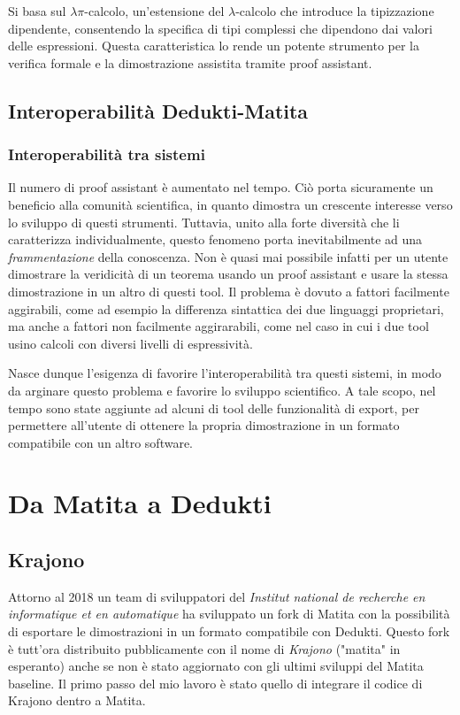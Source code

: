 \documentclass[12pt,a4paper]{report}
\begin{document}
Si basa sul $\lambda\pi$-calcolo, un'estensione del 
$\lambda$-calcolo che introduce la tipizzazione dipendente, consentendo la
specifica di tipi complessi che dipendono dai valori delle espressioni. Questa
caratteristica lo rende un potente strumento per la verifica formale e la
dimostrazione assistita tramite proof assistant.

\section{Interoperabilità Dedukti-Matita}

\subsection{Interoperabilità tra sistemi}
Il numero di proof assistant è aumentato nel tempo. Ciò porta sicuramente un
beneficio alla comunità scientifica, in quanto dimostra un crescente interesse
verso lo sviluppo di questi strumenti. Tuttavia, unito alla forte diversità che
li caratterizza individualmente, questo fenomeno porta inevitabilmente
ad una \textit{frammentazione} della conoscenza. Non è quasi mai possibile infatti
per un utente dimostrare la veridicità di un teorema usando un proof assistant
e usare la stessa dimostrazione in un altro di questi tool. Il problema è dovuto
a fattori facilmente aggirabili, come ad esempio la differenza sintattica dei due
linguaggi proprietari, ma anche a fattori non facilmente aggirarabili, come nel
caso in cui i due tool usino calcoli con diversi livelli di espressività.

Nasce dunque l'esigenza di favorire l'interoperabilità tra questi sistemi, in
modo da arginare questo problema e favorire lo sviluppo scientifico. 
A tale scopo, nel tempo sono state aggiunte ad alcuni di tool delle funzionalità
di export, per permettere all'utente di ottenere la propria dimostrazione in un
formato compatibile con un altro software.

\chapter{Da Matita a Dedukti} \label{capitoloExport}
\section{Krajono}
Attorno al 2018 un team di sviluppatori del 
\textit{Institut national de recherche
en informatique et en automatique} %
ha sviluppato un fork di Matita con la possibilità di esportare le dimostrazioni
in un formato compatibile con Dedukti. Questo fork è tutt'ora distribuito 
pubblicamente con il nome di \textit{Krajono} ("matita" in esperanto) anche se 
non è stato aggiornato con gli ultimi sviluppi del Matita baseline.
Il primo passo del mio lavoro è stato quello di integrare il codice di Krajono
dentro a Matita.
\end{document}

